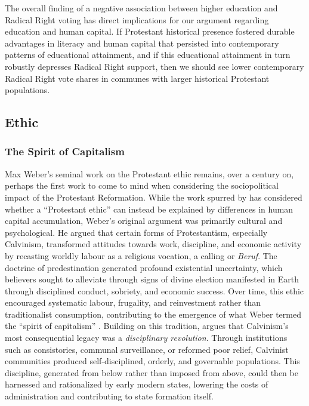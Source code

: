 \documentclass[12pt]{article}
\begin{document}
The overall finding of a negative association between higher education and Radical Right voting has direct implications for our argument regarding education and human capital. If Protestant historical presence fostered durable advantages in literacy and human capital that persisted into contemporary patterns of educational attainment, and if this educational attainment in turn robustly depresses Radical Right support, then we should see lower contemporary Radical Right vote shares in communes with larger historical Protestant populations. 

\subsection{Ethic}

\subsubsection{The Spirit of Capitalism}

Max Weber's \parencite*{weberProtestantEthicSpirit2012} seminal work on the Protestant ethic remains, over a century on, perhaps the first work to come to mind when considering the sociopolitical impact of the Protestant Reformation. While the work spurred by \textcite{beckerWasWeberWrong2009} has considered whether a ``Protestant ethic'' can instead be explained by differences in human capital accumulation, Weber's original argument was primarily cultural and psychological. He argued that certain forms of Protestantism, especially Calvinism, transformed attitudes towards work, discipline, and economic activity by recasting worldly labour as a religious vocation, a calling or \textit{Beruf}. The doctrine of predestination generated profound existential uncertainty, which believers sought to alleviate through signs of divine election manifested in Earth through disciplined conduct, sobriety, and economic success. Over time, this ethic encouraged systematic labour, frugality, and reinvestment rather than traditionalist consumption, contributing to the emergence of what Weber termed the ``spirit of capitalism'' \parencite{kalbergMaxWebersSociology2024}. Building on this tradition, \textcite{gorskiDisciplinaryRevolutionCalvinism2003} argues that Calvinism's most consequential legacy was a \textit{disciplinary revolution}. Through institutions such as consistories, communal surveillance, or reformed poor relief, Calvinist communities produced self-disciplined, orderly, and governable populations. This discipline, generated from below rather than imposed from above, could then be harnessed and rationalized by early modern states, lowering the costs of administration and contributing to state formation itself.
\end{document}
